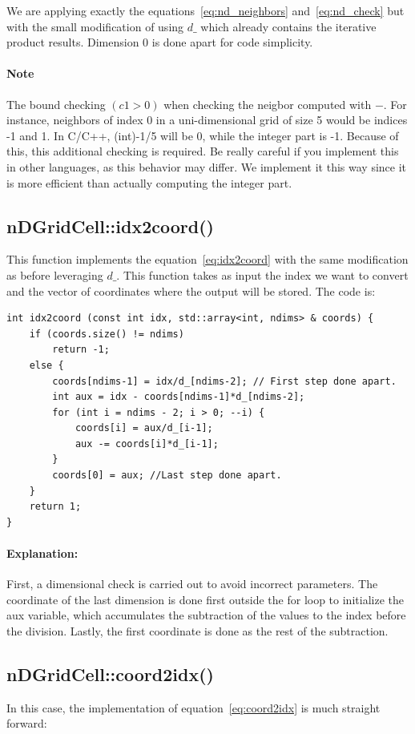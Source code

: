 \documentclass[12pt]{article}
\begin{document}
We are applying exactly the equations~\ref{eq:nd_neighbors} and~\ref{eq:nd_check} but with the small modification of using $d\_$ which already contains the iterative product results. Dimension 0 is done apart for code simplicity. 

\paragraph{Note} The bound checking $(c1 > 0)$ when checking the neigbor computed with $-$. For instance, neighbors of index 0 in a uni-dimensional grid of size 5 would be indices -1 and 1. In C/C++, (int)-1/5 will be 0, while the integer part is -1. Because of this, this additional checking is required. Be really careful if you implement this in other languages, as this behavior may differ. We implement it this way since it is more efficient than actually computing the integer part.


\subsection{nDGridCell::idx2coord()}
This function implements the equation~\ref{eq:idx2coord} with the same modification as before leveraging $d\_$. This function takes as input the index we want to convert and the vector of coordinates where the output will be stored. The code is:

\begin{lstlisting}
int idx2coord (const int idx, std::array<int, ndims> & coords) {
	if (coords.size() != ndims)
		return -1;
	else {
		coords[ndims-1] = idx/d_[ndims-2]; // First step done apart.
		int aux = idx - coords[ndims-1]*d_[ndims-2];
		for (int i = ndims - 2; i > 0; --i) {
			coords[i] = aux/d_[i-1];
			aux -= coords[i]*d_[i-1];
		}
		coords[0] = aux; //Last step done apart.
	}
	return 1;
}
\end{lstlisting}

\paragraph{Explanation:} First, a dimensional check is carried out to avoid incorrect parameters. The coordinate of the last dimension is done first outside the for loop to initialize the aux variable, which accumulates the subtraction of the values to the index before the division. Lastly, the first coordinate is done as the rest of the subtraction. 

\subsection{nDGridCell::coord2idx()}
In this case, the implementation of equation~\ref{eq:coord2idx} is much straight forward:
\end{document}
